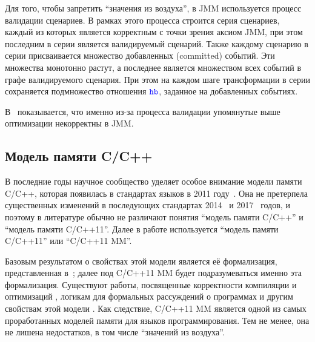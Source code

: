 
Для того, чтобы запретить ``значения из воздуха'', в JMM используется процесс
валидации сценариев.
В рамках этого процесса строится серия сценариев, каждый из которых является корректным с точки зрения аксиом JMM,
при этом последним в серии является валидируемый сценарий.
Также каждому сценарию в серии присваивается множество добавленных (committed) событий.
Эти множества монотонно растут, а последнее является множеством всех событий в графе валидируемого сценария.
При этом на каждом шаге трансформации в серии сохраняется подмножество отношения $\lHB$, заданное на добавленных
событиях.

В~\cite{Sevcik-Aspinall:ECOOP08} показывается, что именно из-за процесса валидации упомянутые выше оптимизации
некорректны в JMM.

\subsection{Модель памяти C/C++}
\label{sec:cppmodel}
В последние годы научное сообщество уделяет особое внимание модели памяти C/C++,
которая появилась в стандартах языков в 2011 году~\cite{C:11,CPP:11}.
Она не претерпела существенных изменений в последующих стандартах 2014~\cite{CPP:14} и 2017~\cite{CPP:17} годов,
и поэтому в литературе обычно не различают понятия ``модель памяти C/C++'' и ``модель памяти C/C++11''.
Далее в работе используется ``модель памяти C/C++11'' или ``C/C++11 MM''\label{acr:cppmm}.

Базовым результатом о свойствах этой модели является её формализация, представленная 
в~\cite{Batty-al:POPL11}; далее под C/C++11 MM будет подразумеваться именно эта формализация.
Существуют работы, посвященные корректности компиляции и оптимизаций
\cite{Batty-al:POPL12,Vafeiadis-al:POPL15,Chakraborty-Vafeiadis:CGO16,Lahav-al:PLDI17,Batty-al:POPL16},
логикам для формальных рассуждений о программах
\cite{Turon-al:OOPSLA14,Vafeiadis-Narayan:OOPSLA13,Lahav-Vafeiadis:ICALP15,Doko-Vafeiadis:VMCAI16,Vafeiadis:CPP15}
и другим свойствам этой модели
\cite{Batty-al:POPL13,Batty-al:ESOP15,Lidbury-Donaldson:POPL17, Tassarotti-al:PLDI15,Doko-Vafeiadis:ESOP17}.
Как следствие, C/C++11 MM является одной из самых проработанных моделей памяти для языков программирования.
Тем не менее, она не лишена недостатков, в том числе ``значений из воздуха''.

